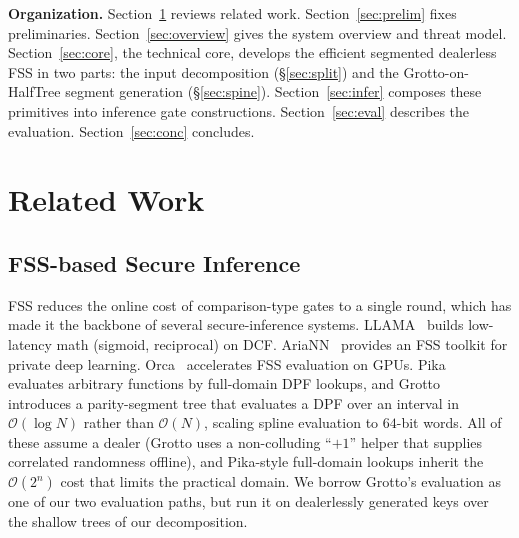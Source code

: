 \documentclass[journal]{IEEEtran}
\theoremstyle{definition}
\theoremstyle{plain}
\newcommand{\bigO}{\mathcal{O}}
\begin{document}
\noindent\textbf{Organization.}
Section~\ref{sec:related} reviews related work. Section~\ref{sec:prelim} fixes
preliminaries. Section~\ref{sec:overview} gives the system overview and threat
model. Section~\ref{sec:core}, the technical core, develops the efficient
segmented dealerless FSS in two parts: the input decomposition
(\S\ref{sec:split}) and the Grotto-on-HalfTree segment generation
(\S\ref{sec:spine}). Section~\ref{sec:infer} composes these
primitives into inference gate constructions. Section~\ref{sec:eval} describes the
evaluation. Section~\ref{sec:conc} concludes.

\section{Related Work}\label{sec:related}

\subsection{FSS-based Secure Inference}
FSS reduces the online cost of comparison-type gates to a single round, which has
made it the backbone of several secure-inference systems. LLAMA~\cite{llama}
builds low-latency math (sigmoid, reciprocal) on DCF. AriaNN~\cite{ariann}
provides an FSS toolkit for private deep learning. Orca~\cite{orca} accelerates
FSS evaluation on GPUs. Pika~\cite{pika} evaluates arbitrary functions by
full-domain DPF lookups, and Grotto~\cite{grotto} introduces a parity-segment
tree that evaluates a DPF over an interval in $\bigO(\log N)$ rather than
$\bigO(N)$, scaling spline evaluation to $64$-bit words. All of these assume a
dealer (Grotto uses a non-colluding ``$+1$'' helper that supplies correlated
randomness offline), and Pika-style full-domain lookups inherit the
$\bigO(2^{n})$ cost that limits the practical domain. We borrow Grotto's
evaluation as one of our two evaluation paths, but run it on dealerlessly
generated keys over the shallow trees of our decomposition.
\end{document}
